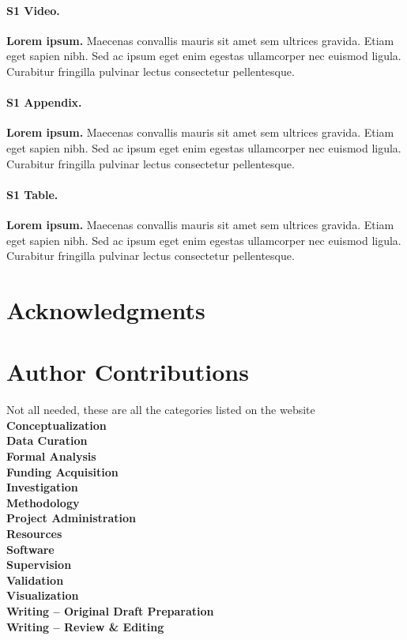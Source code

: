 \documentclass[10pt,letterpaper]{article}
\begin{document}
	\paragraph*{S1 Video.}
	\label{S1_Video}
	{\bf Lorem ipsum.}  Maecenas convallis mauris sit amet sem ultrices gravida. Etiam eget sapien nibh. Sed ac ipsum eget enim egestas ullamcorper nec euismod ligula. Curabitur fringilla pulvinar lectus consectetur pellentesque.
	
	\paragraph*{S1 Appendix.}
	\label{S1_Appendix}
	{\bf Lorem ipsum.} Maecenas convallis mauris sit amet sem ultrices gravida. Etiam eget sapien nibh. Sed ac ipsum eget enim egestas ullamcorper nec euismod ligula. Curabitur fringilla pulvinar lectus consectetur pellentesque.
	
	\paragraph*{S1 Table.}
	\label{S1_Table}
	{\bf Lorem ipsum.} Maecenas convallis mauris sit amet sem ultrices gravida. Etiam eget sapien nibh. Sed ac ipsum eget enim egestas ullamcorper nec euismod ligula. Curabitur fringilla pulvinar lectus consectetur pellentesque.
	
	\section*{Acknowledgments}
	
	
	
	\nolinenumbers
	
	\section*{Author Contributions}
	\textinterrobang Not all needed, these are all the categories listed on the website \\\noindent
	\textbf{Conceptualization} \\\noindent
	\textbf{Data Curation} \\\noindent
	\textbf{Formal Analysis} \\\noindent
	\textbf{Funding Acquisition} \\\noindent
	\textbf{Investigation} \\\noindent
	\textbf{Methodology} \\\noindent
	\textbf{Project Administration} \\\noindent
	\textbf{Resources} \\\noindent
	\textbf{Software} \\\noindent
	\textbf{Supervision} \\\noindent
	\textbf{Validation} \\\noindent
	\textbf{Visualization} \\\noindent
	\textbf{Writing – Original Draft Preparation} \\\noindent
	\textbf{Writing – Review \& Editing} \\\noindent
	
\end{document}
